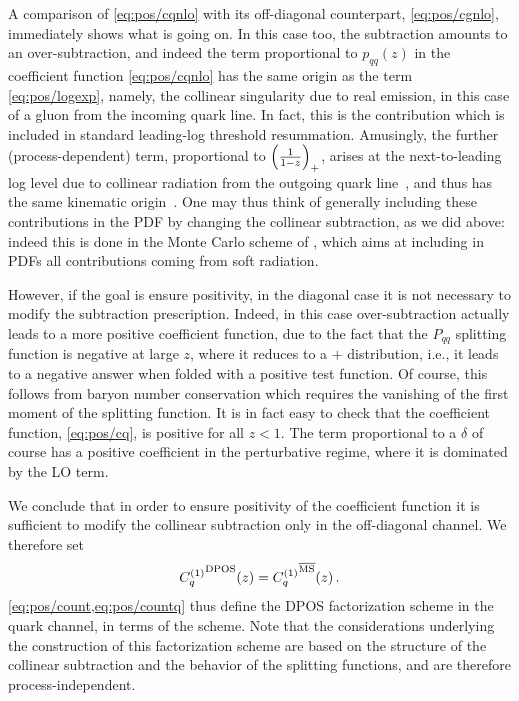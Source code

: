 A comparison of \cref{eq:pos/cqnlo} with its off-diagonal counterpart,
\cref{eq:pos/cgnlo}, immediately shows what is going on. In this
case too, the \msbar{} subtraction amounts to an over-subtraction, and
indeed the term proportional to $p_{qq}(z)$ in the coefficient
function \cref{eq:pos/cqnlo} has the same origin as the term
\cref{eq:pos/logexp}, namely, the collinear singularity due to real
emission, in this case of a gluon from the incoming quark line. In
fact,  this is the contribution which is included in standard
leading-log threshold resummation. Amusingly, the further
(process-dependent)
term, proportional
to ${ \left( \frac{1}{1-z} \right)_+ }$, arises at the next-to-leading log level due to collinear
radiation from the outgoing quark line~\cite{Catani:1989ne}, and thus has
the same kinematic origin~\cite{Forte:2002ni}.
One may thus think of generally including these contributions in the
PDF by changing the collinear subtraction, as we did above: indeed
this is done in the Monte Carlo scheme of
\cite{Jadach:2016acv}, which aims at including in PDFs
all contributions coming from soft radiation.


However, if the goal is ensure positivity, in the diagonal case
it is not necessary to
modify the \msbar{}  subtraction prescription. Indeed,
in this case over-subtraction actually leads to a more positive
coefficient function, due to the fact that the $P_{qq}$ splitting
function  is negative at large $z$, where it reduces to a $+$
distribution,
i.e., it leads to a negative answer
when folded with a positive test function. Of course, this follows from
baryon number conservation which requires the vanishing of the first
moment of the splitting function. It is in fact easy to check that the
\msbar{} coefficient function, \cref{eq:pos/cq}, is positive for all
$z<1$. The  term proportional to a $\delta$ of course has a positive
coefficient in the perturbative regime, where it is dominated by the
LO term.

We conclude that in order to ensure positivity of the coefficient
function it is sufficient to modify the collinear subtraction only in the
off-diagonal channel. We therefore set
\begin{align}\label{eq:pos/countq}
   {C_{q}^{(1)}}^{\textrm{DPOS}}(z)=  {C_{q}^{(1)}}^{{\overline{\textrm{MS}}}}(z) \,.
\end{align}
\cref{eq:pos/count,eq:pos/countq} thus define the DPOS
factorization scheme in the quark channel, in terms of the \msbar{} scheme.
Note that the considerations underlying the construction of this
factorization scheme are based on the
structure of the collinear subtraction and the behavior of the
splitting functions, and are therefore process-independent.

